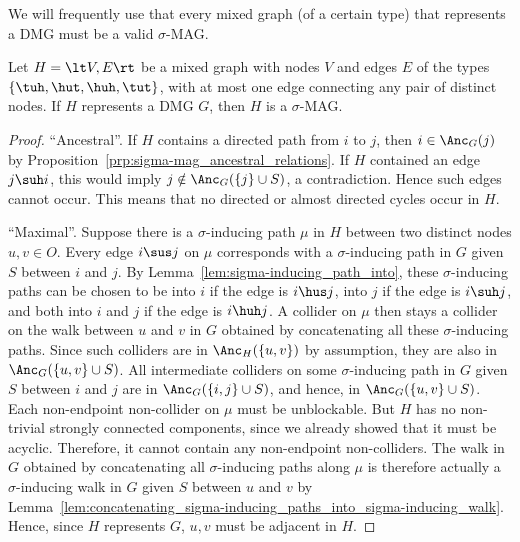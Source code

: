 We will frequently use that every mixed graph (of a certain type) that represents a DMG must be a valid $\sigma$-MAG.
\begin{Prp}\label{prp:sigma-mag_representing_dmg_is_valid}
Let $H = \lt V,E\rt$ be a mixed graph with nodes $V$ and edges $E$ of the types $\{\tuh,\hut,\huh,\tut\}$, with at most one edge connecting any pair of distinct nodes.
If $H$ represents a DMG $G$, then $H$ is a $\sigma$-MAG.
\end{Prp}
\begin{proof}
  ``Ancestral''. If $H$ contains a directed path from $i$ to $j$, then $i \in \Anc_G(j)$ by Proposition~\ref{prp:sigma-mag_ancestral_relations}.
  If $H$ contained an edge $j \suh i$, this would imply $j \notin \Anc_G(\{j\} \cup S)$, a contradiction. 
  Hence such edges cannot occur.
  This means that no directed or almost directed cycles occur in $H$.

  ``Maximal''.
  Suppose there is a $\sigma$-inducing path $\mu$ in $H$ between two distinct nodes $u,v \in O$. 
  Every edge $i \sus j$ on $\mu$ corresponds with a $\sigma$-inducing path in $G$ given $S$ between $i$ and $j$.
  By Lemma~\ref{lem:sigma-inducing_path_into}, these $\sigma$-inducing paths can be chosen to be into $i$ if the edge is $i \hus j$, into $j$ if the edge is $i \suh j$, and both into $i$ and $j$ if the edge is $i \huh j$. 
  A collider on $\mu$ then stays a collider on the walk between $u$ and $v$ in $G$ obtained by concatenating all these $\sigma$-inducing paths.
  Since such colliders are in $\Anc_H(\{u,v\})$ by assumption, they are also in $\Anc_G(\{u,v\} \cup S)$.
  All intermediate colliders on some $\sigma$-inducing path in $G$ given $S$ between $i$ and $j$ are in $\Anc_G(\{i,j\} \cup S)$, and hence, in $\Anc_G(\{u,v\} \cup S)$.
  Each non-endpoint non-collider on $\mu$ must be unblockable.
  But $H$ has no non-trivial strongly connected components, since we already showed that it must be acyclic.
  Therefore, it cannot contain any non-endpoint non-colliders.
  The walk in $G$ obtained by concatenating all $\sigma$-inducing paths along $\mu$ is therefore actually a $\sigma$-inducing walk in $G$ given $S$ between $u$ and $v$ by Lemma~\ref{lem:concatenating_sigma-inducing_paths_into_sigma-inducing_walk}.
  Hence, since $H$ represents $G$, $u,v$ must be adjacent in $H$.
\end{proof}

